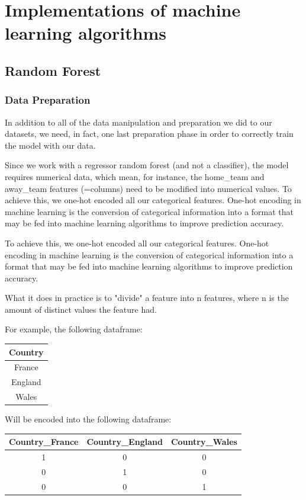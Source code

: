 \chapter{\fontsize{15}{12}\selectfont Implementations of machine learning algorithms}

\section{Random Forest}
\subsection{Data Preparation}
In addition to all of the data manipulation and preparation we did to our datasets, we need, in fact, one last preparation phase in order to correctly train the model with our data. 

Since we work with a regressor random forest (and not a classifier), the model requires numerical data, which mean, for instance, the home\_team and away\_team features (=columns) need to be modified into numerical values.
To achieve this, we one-hot encoded all our categorical features.
One-hot encoding in machine learning is the conversion of categorical information into a format that may be fed into machine learning algorithms to improve prediction accuracy.


To achieve this, we one-hot encoded all our categorical features.
One-hot encoding in machine learning is the conversion of categorical information into a format that may be fed into machine learning algorithms to improve prediction accuracy.

What it does in practice is to "divide" a feature into n features, where n is the amount of distinct values the feature had.

For example, the following dataframe:
\begin{table}[h]
  \centering
  \begin{tabular}{|c|}
    \hline
    Country\\
    \hline
    France
     \\
    \hline
    England\\
    \hline
    Wales\\
    \hline
  \end{tabular}
  \label{tab:exemple}
\end{table}


Will be encoded into the following dataframe:\\
\begin{table}[h]
  \centering
  \begin{tabular}{|c|c|c|}
    \hline
    Country\_France & Country\_England & Country\_Wales \\
    \hline
    1 & 0 & 0 \\
    \hline
    0 & 1 & 0 \\
    \hline
    0 & 0 & 1 \\
    \hline
  \end{tabular}
  \label{tab:exemple}
\end{table}

